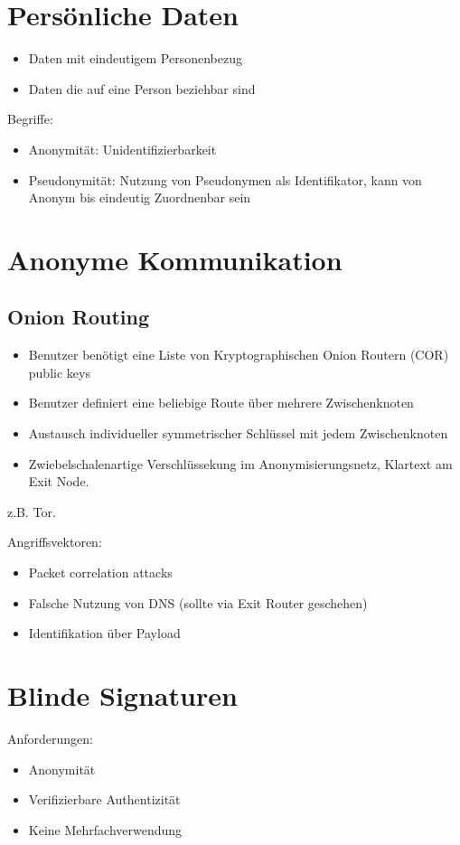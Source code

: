 \section{Persönliche Daten}
\begin{itemize}
    \item Daten mit eindeutigem Personenbezug
    \item Daten die auf eine Person beziehbar sind
\end{itemize}

Begriffe:
\begin{itemize}
    \item Anonymität: Unidentifizierbarkeit
    \item Pseudonymität: Nutzung von Pseudonymen als Identifikator, kann von Anonym bis eindeutig Zuordnenbar sein
\end{itemize}

\section{Anonyme Kommunikation}
\subsection{Onion Routing}
\begin{itemize}
    \item Benutzer benötigt eine Liste von Kryptographischen Onion Routern (COR) public keys
    \item Benutzer definiert eine beliebige Route über mehrere Zwischenknoten
    \item Austausch individueller symmetrischer Schlüssel mit jedem Zwischenknoten
    \item Zwiebelschalenartige Verschlüssekung im Anonymisierungsnetz, Klartext am Exit Node.
\end{itemize}
z.B. Tor.

\vspace{.3cm}

Angriffsvektoren:
\begin{itemize}
    \item Packet correlation attacks
    \item Falsche Nutzung von DNS (sollte via Exit Router geschehen)
    \item Identifikation über Payload
\end{itemize}

\section{Blinde Signaturen}
Anforderungen:
\begin{itemize}
    \item Anonymität
    \item Verifizierbare Authentizität
    \item Keine Mehrfachverwendung
\end{itemize}

